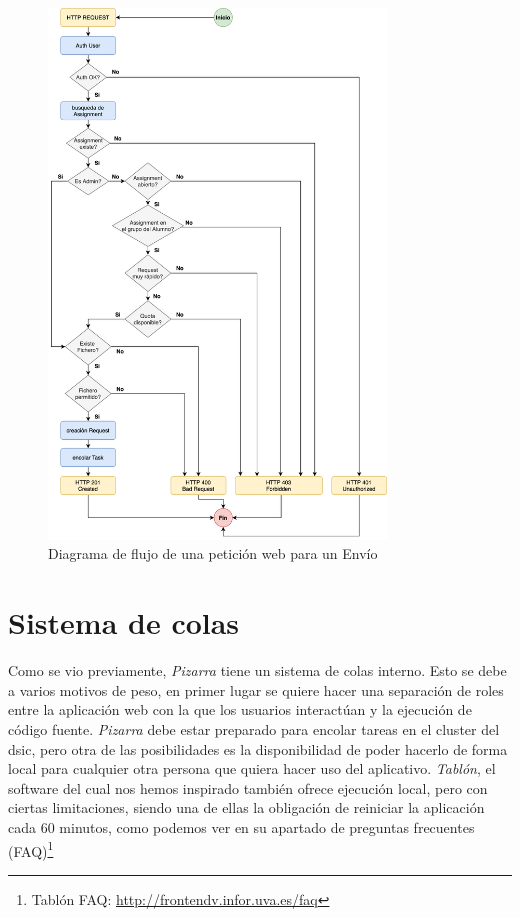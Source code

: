 \documentclass[11pt,spanish,listoffigures,listoftables]{tfgetsinf}
\begin{document}
\begin{figure}[!ht]
	\centering
	\includegraphics[width=0.8\textwidth]{img/request-flowchart}
	\caption[Diagrama de flujo de una petición web para un Envío]{Diagrama de flujo de una petición web para un Envío}
	\label{figura:request-flowchart}
\end{figure}

\section{Sistema de colas}

Como se vio previamente, \textit{Pizarra} tiene un sistema de \Gls{cola}s interno. Esto se debe a varios motivos de peso, en primer lugar se quiere hacer una separación de roles entre la aplicación web con la que los usuarios interactúan y la ejecución de código fuente. \textit{Pizarra} debe estar preparado para encolar tareas en el cluster \kahan del \acrshort{dsic}, pero otra de las posibilidades es la disponibilidad de poder hacerlo de forma local para cualquier otra persona que quiera hacer uso del aplicativo. \textit{Tablón}, el software del cual nos hemos inspirado también ofrece ejecución local, pero con ciertas limitaciones, siendo una de ellas la obligación de reiniciar la aplicación cada 60 minutos, como podemos ver en su apartado de preguntas frecuentes (FAQ)\footnote{Tablón FAQ: \url{http://frontendv.infor.uva.es/faq}}
\end{document}
